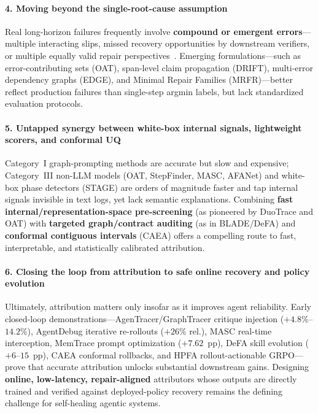 \paragraph{4. Moving beyond the single-root-cause assumption}
Real long-horizon failures frequently involve \textbf{compound or emergent errors}---multiple interacting slips, missed recovery opportunities by downstream verifiers, or multiple equally valid repair perspectives~\citep{in2026mpbench,yeh2026oat,hou2026edge,li2026mrfr}. Emerging formulations---such as error-contributing sets (OAT), span-level claim propagation (DRIFT), multi-error dependency graphs (EDGE), and Minimal Repair Families (MRFR)---better reflect production failures than single-step argmin labels, but lack standardized evaluation protocols.

\paragraph{5. Untapped synergy between white-box internal signals, lightweight scorers, and conformal UQ}
Category~I graph-prompting methods are accurate but slow and expensive; Category~III non-LLM models (OAT, StepFinder, MASC, AFANet) and white-box phase detectors (STAGE) are orders of magnitude faster and tap internal signals invisible in text logs, yet lack semantic explanations. Combining \textbf{fast internal/representation-space pre-screening} (as pioneered by DuoTrace and OAT) with \textbf{targeted graph/contract auditing} (as in BLADE/DeFA) and \textbf{conformal contiguous intervals} (CAEA) offers a compelling route to fast, interpretable, and statistically calibrated attribution.

\paragraph{6. Closing the loop from attribution to safe online recovery and policy evolution}
Ultimately, attribution matters only insofar as it improves agent reliability. Early closed-loop demonstrations---AgenTracer/GraphTracer critique injection ($+4.8\%$--$14.2\%$), AgentDebug iterative re-rollouts ($+26\%$ rel.), MASC real-time interception, MemTrace prompt optimization ($+7.62$~pp), DeFA skill evolution ($+6$--$15$~pp), CAEA conformal rollbacks, and HPFA rollout-actionable GRPO---prove that accurate attribution unlocks substantial downstream gains. Designing \textbf{online, low-latency, repair-aligned} attributors whose outputs are directly trained and verified against deployed-policy recovery remains the defining challenge for self-healing agentic systems.
